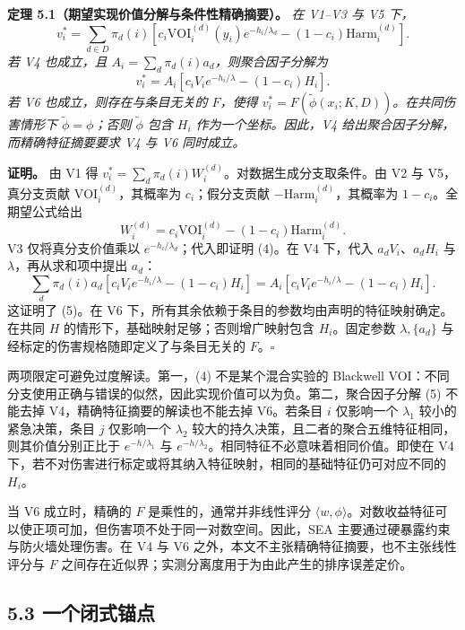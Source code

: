 \documentclass[
  chinese,
  11pt]{article}
\begin{document}
\textbf{定理 5.1（期望实现价值分解与条件性精确摘要）。} \emph{在 V1--V3 与 V5 下，} \[
v_i^*=\sum_{d\in D}\pi_d(i)\left[
 c_i\mathrm{VOI}_i^{(d)}(y_i)e^{-h_i/\lambda_d}
 -(1-c_i)\mathrm{Harm}_i^{(d)}\right].
\tag{4}
\] \emph{若 V4 也成立，且 \(A_i=\sum_d\pi_d(i)a_d\)，则聚合因子分解为} \[
v_i^*=A_i\left[c_iV_ie^{-h_i/\lambda}-(1-c_i)H_i\right].
\tag{5}
\] \emph{若 V6 也成立，则存在与条目无关的 \(F\)，使得 \(v_i^*=F(\tilde\phi(x_i;K,D))\)。在共同伤害情形下 \(\tilde\phi=\phi\)；否则 \(\tilde\phi\) 包含 \(H_i\) 作为一个坐标。因此，V4 给出聚合因子分解，而精确特征摘要要求 V4 与 V6 同时成立。}

\textbf{证明。} 由 V1 得 \(v_i^*=\sum_d\pi_d(i)W_i^{(d)}\)。对数据生成分支取条件。由 V2 与 V5，真分支贡献 \(\mathrm{VOI}_i^{(d)}\)，其概率为 \(c_i\)；假分支贡献 \(-\mathrm{Harm}_i^{(d)}\)，其概率为 \(1-c_i\)。全期望公式给出 \[
W_i^{(d)}=c_i\mathrm{VOI}_i^{(d)}-(1-c_i)\mathrm{Harm}_i^{(d)}.
\] V3 仅将真分支价值乘以 \(e^{-h_i/\lambda_d}\)；代入即证明 (4)。在 V4 下，代入 \(a_dV_i\)、\(a_dH_i\) 与 \(\lambda\)，再从求和项中提出 \(a_d\)： \[
\sum_d\pi_d(i)a_d[c_iV_ie^{-h_i/\lambda}-(1-c_i)H_i]
=A_i[c_iV_ie^{-h_i/\lambda}-(1-c_i)H_i].
\] 这证明了 (5)。在 V6 下，所有其余依赖于条目的参数均由声明的特征映射确定。在共同 \(H\) 的情形下，基础映射足够；否则增广映射包含 \(H_i\)。固定参数 \(\lambda,\{a_d\}\) 与经标定的伤害规格随即定义了与条目无关的 \(F\)。\(\square\)

两项限定可避免过度解读。第一，(4) 不是某个混合实验的 Blackwell VOI：不同分支使用正确与错误的似然，因此实现价值可以为负。第二，聚合因子分解 (5) 不能去掉 V4，精确特征摘要的解读也不能去掉 V6。若条目 \(i\) 仅影响一个 \(\lambda_1\) 较小的紧急决策，条目 \(j\) 仅影响一个 \(\lambda_2\) 较大的持久决策，且二者的聚合五维特征相同，则其价值分别正比于 \(e^{-h/\lambda_1}\) 与 \(e^{-h/\lambda_2}\)。相同特征不必意味着相同价值。即使在 V4 下，若不对伤害进行标定或将其纳入特征映射，相同的基础特征仍可对应不同的 \(H_i\)。

当 V6 成立时，精确的 \(F\) 是乘性的，通常并非线性评分 \(\langle w,\phi\rangle\)。对数收益特征可以使正项可加，但伤害项不处于同一对数空间。因此，SEA 主要通过硬暴露约束与防火墙处理伤害。在 V4 与 V6 之外，本文不主张精确特征摘要，也不主张线性评分与 \(F\) 之间存在近似界；实测分离度用于为由此产生的排序误差定价。

\subsection{5.3 一个闭式锚点}\label{ux4e00ux4e2aux95edux5f0fux951aux70b9}
\end{document}
